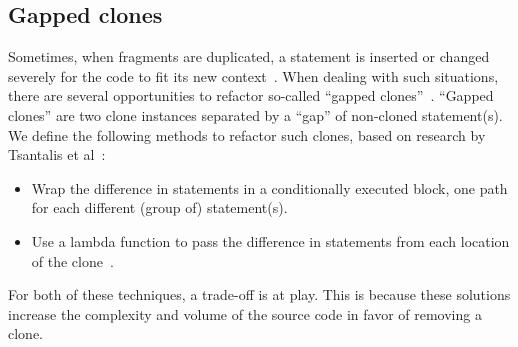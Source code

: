 \documentclass[a4paper,UKenglish,cleveref, autoref, thm-restate,authorcolumns]{lipics-v2019}
\begin{document}
\subsection{Gapped clones} \label{sec:t3r}
Sometimes, when fragments are duplicated, a statement is inserted or changed severely for the code to fit its new context~\cite{roy2007survey}. When dealing with such situations, there are several opportunities to refactor so-called ``gapped clones''~\cite{ueda2002detection, zhao2018automatic}. ``Gapped clones'' are two clone instances separated by a ``gap'' of non-cloned statement(s). We define the following methods to refactor such clones, based on research by Tsantalis et al~\cite{tsantalis2015assessing}:
\begin{itemize}
  \item Wrap the difference in statements in a conditionally executed block, one path for each different (group of) statement(s).
  \item Use a lambda function to pass the difference in statements from each location of the clone~\cite{tsantalis2017clone}.
\end{itemize}
For both of these techniques, a trade-off is at play. This is because these solutions increase the complexity and volume of the source code in favor of removing a clone.
\end{document}
